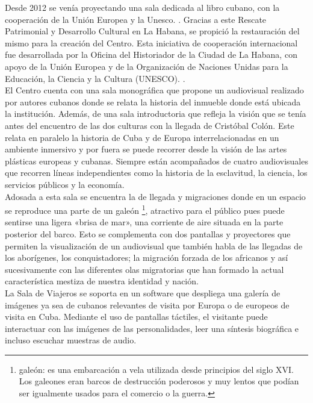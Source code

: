         Desde 2012 se venía proyectando una sala dedicada al libro cubano, con la cooperación de la Unión Europea y la Unesco. \cite{oficinaHistoriadorRescatepatrimonio}. Gracias a este Rescate Patrimonial y Desarrollo Cultural en La Habana, se propició la restauración del mismo para la creación del Centro. Esta iniciativa de cooperación internacional fue desarrollada por la Oficina del Historiador de la Ciudad de La Habana, con apoyo de la Unión Europea y de la Organización de Naciones Unidas para la Educación, la Ciencia y la Cultura (UNESCO). \cite{potencialidadProyectoMuseologico}.\\
        
        El Centro cuenta con una sala monográfica que propone un audiovisual realizado por autores cubanos donde se relata la historia del inmueble donde está ubicada la institución. Además, de una sala introductoria que refleja la visión que se tenía antes del encuentro de las dos culturas con la llegada de Cristóbal Colón. Este relata en paralelo la historia de Cuba y de Europa interrelacionadas en un ambiente inmersivo y por fuera se puede recorrer desde la visión de las artes plásticas europeas y cubanas. Siempre están acompañados de cuatro audiovisuales que recorren líneas independientes como la historia de la esclavitud, la ciencia, los servicios públicos y la economía.\\
        
        Adosada a esta sala se encuentra la de llegada y migraciones donde en un espacio se reproduce una parte de un galeón \footnote{gale\'on: es una embarcación a vela utilizada desde principios del siglo XVI. Los galeones eran barcos de destrucción poderosos y muy lentos que podían ser igualmente usados para el comercio o la guerra.}, atractivo para el público pues puede sentirse una ligera «brisa de mar», una corriente de aire situada en la parte posterior del barco. Esto se complementa con dos pantallas y proyectores que permiten la visualización de un audiovisual que también habla de las llegadas de los aborígenes, los conquistadores; la migración forzada de los africanos y así sucesivamente con las diferentes olas migratorias que han formado la actual característica mestiza de nuestra identidad y nación.\\
        
        La Sala de Viajeros se soporta en un software que despliega una galería de imágenes ya sea de cubanos relevantes de visita por Europa o de europeos de visita en Cuba. Mediante el uso de pantallas táctiles, el visitante puede interactuar con las imágenes de las personalidades, leer una síntesis biográfica e incluso escuchar muestras de audio.
    

